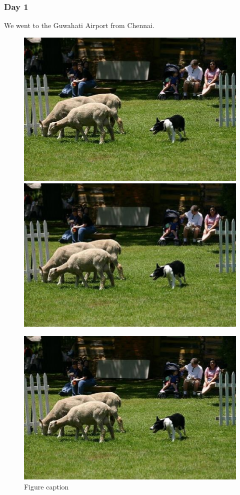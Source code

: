 \documentclass{beamer}
\begin{document}
\begin{frame}
    \frametitle{Day 1}

    We went to the Guwahati Airport from Chennai. 

    \begin{figure}[htp]
        \centering
        \includegraphics[width=.4\textwidth]{img}\qquad
        \includegraphics[width=.4\textwidth]{img}\qquad

        \medskip

        \includegraphics[width=.6\textwidth]{img}

        \caption{Figure caption}
        \label{pics:blablabla}
    \end{figure}

\end{frame}
\end{document}
